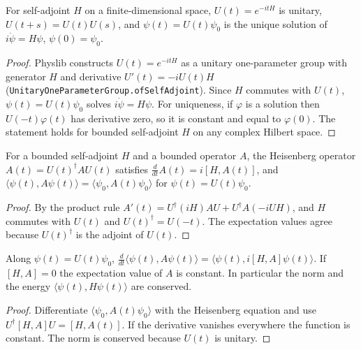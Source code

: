 \begin{theorem}\label{thm:evolution}
  \leanok
  For self-adjoint $H$ on a finite-dimensional space, $U(t)=e^{-itH}$ is unitary, $U(t+s)=U(t)U(s)$, and
  $\psi(t)=U(t)\psi_0$ is the unique solution of $i\dot\psi = H\psi$, $\psi(0)=\psi_0$.
\end{theorem}
\begin{proof}\leanok
  Physlib constructs $U(t)=e^{-itH}$ as a unitary one-parameter group with generator $H$ and derivative
  $U'(t)=-iU(t)H$ (\texttt{UnitaryOneParameterGroup.ofSelfAdjoint}). Since $H$ commutes with $U(t)$, $\psi(t)=U(t)\psi_0$
  solves $i\dot\psi=H\psi$. For uniqueness, if $\varphi$ is a solution then $U(-t)\varphi(t)$ has derivative zero, so it is
  constant and equal to $\varphi(0)$. The statement holds for bounded self-adjoint $H$ on any complex Hilbert space.
\end{proof}

\begin{theorem}\label{thm:heisenberg}
  \leanok
  For a bounded self-adjoint $H$ and a bounded operator $A$, the Heisenberg operator $A(t)=U(t)^\dagger AU(t)$ satisfies
  $\tfrac{d}{dt}A(t)=i[H,A(t)]$, and $\langle\psi(t),A\psi(t)\rangle=\langle\psi_0,A(t)\psi_0\rangle$ for $\psi(t)=U(t)\psi_0$.
\end{theorem}
\begin{proof}\leanok
  By the product rule $A'(t)=U^\dagger(iH)AU+U^\dagger A(-iUH)$, and $H$ commutes with $U(t)$ and $U(t)^\dagger=U(-t)$.
  The expectation values agree because $U(t)^\dagger$ is the adjoint of $U(t)$.
\end{proof}

\begin{theorem}\label{thm:ehrenfest}
  \leanok
  Along $\psi(t)=U(t)\psi_0$, $\tfrac{d}{dt}\langle\psi(t),A\psi(t)\rangle=\langle\psi(t),i[H,A]\psi(t)\rangle$. If $[H,A]=0$ the
  expectation value of $A$ is constant. In particular the norm and the energy $\langle\psi(t),H\psi(t)\rangle$ are conserved.
\end{theorem}
\begin{proof}\leanok
  Differentiate $\langle\psi_0,A(t)\psi_0\rangle$ with the Heisenberg equation and use $U^\dagger[H,A]U=[H,A(t)]$. If the
  derivative vanishes everywhere the function is constant. The norm is conserved because $U(t)$ is unitary.
\end{proof}

